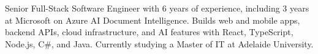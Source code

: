 
Senior Full-Stack Software Engineer with 6 years of experience, including 3 years at Microsoft on Azure AI Document Intelligence. Builds web and mobile apps, backend APIs, cloud infrastructure, and AI features with React, TypeScript, Node.js, C\#, and Java. Currently studying a Master of IT at Adelaide University.
